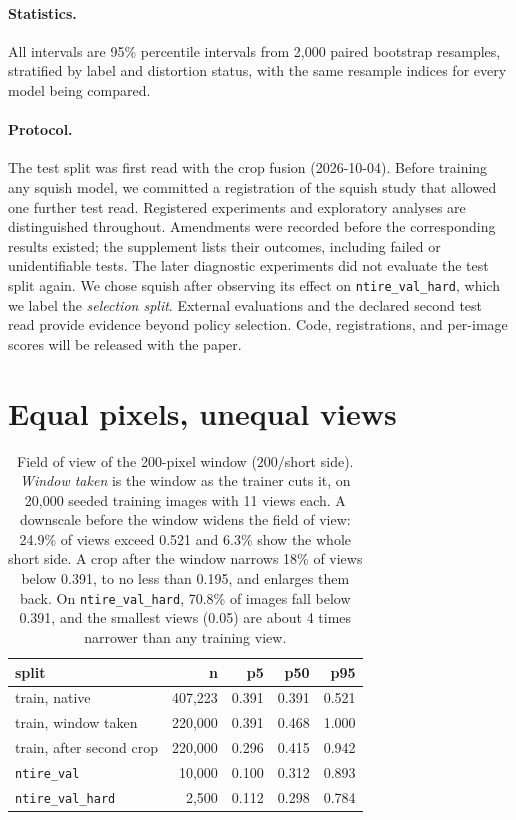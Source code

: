\documentclass[letterpaper]{article} %
\begin{document}
\paragraph{Statistics.} All intervals are 95\% percentile intervals from 2,000
paired bootstrap resamples, stratified by label and distortion status, with
the same resample indices for every model being compared.

\paragraph{Protocol.} The test split was first read with the crop fusion
(2026-10-04). Before training any squish model, we committed a registration
of the squish study that allowed one further test read. Registered
experiments and exploratory analyses are distinguished throughout.
Amendments were recorded before the corresponding results existed; the
supplement lists their outcomes, including failed or unidentifiable tests.
The later diagnostic experiments did not evaluate the test split again.
We chose squish after observing its effect on \texttt{ntire\_val\_hard},
which we label the \emph{selection split}. External evaluations and the
declared second test read provide evidence beyond policy selection. Code,
registrations, and per-image scores will be released with the paper.

\section{Equal pixels, unequal views}
\label{sec:diagnosis}

\begin{table}[t]
\centering
\small
\begin{tabular}{lrrrr}
\toprule
split & n & p5 & p50 & p95 \\
\midrule
train, native & 407,223 & 0.391 & 0.391 & 0.521 \\
train, window taken & 220,000 & 0.391 & 0.468 & 1.000 \\
train, after second crop & 220,000 & 0.296 & 0.415 & 0.942 \\
\texttt{ntire\_val} & 10,000 & 0.100 & 0.312 & 0.893 \\
\texttt{ntire\_val\_hard} & 2,500 & 0.112 & 0.298 & 0.784 \\
\bottomrule
\end{tabular}
\caption{Field of view of the 200-pixel window ($200/$short side).
\emph{Window taken} is the window as the trainer cuts it, on 20,000 seeded
training images with 11 views each. A downscale before the window widens the
field of view: 24.9\% of views exceed 0.521 and 6.3\% show the whole short
side. A crop after the window narrows 18\% of views below 0.391, to no less
than 0.195, and enlarges them back. On \texttt{ntire\_val\_hard}, 70.8\% of
images fall below 0.391, and the smallest views (0.05) are about 4 times
narrower than any training view.}
\label{tab:fov}
\end{table}
\end{document}
